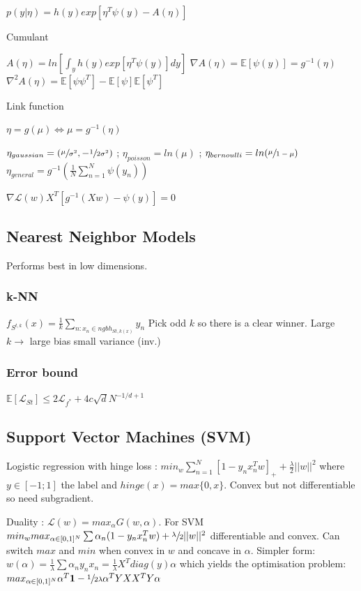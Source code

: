 $p(y|\eta) = h(y) exp[\eta^T \psi(y) - A(\eta)]$

Cumulant

$A(\eta) = ln[\int_y h(y) exp[\eta^T \psi(y)] dy]$
\newline
$\nabla A(\eta) = \mathbb{E}[\psi(y)] = g^{-1}(\eta)$
\newline
$\nabla^2 A(\eta) = \mathbb{E}[\psi\psi^T] - \mathbb{E}[\psi]\mathbb{E}[\psi^T]$

Link function

$\eta = g(\mu) \Leftrightarrow \mu = g^{-1}(\eta)$

$\eta_{gaussian} = (\sfrac{\mu}{\sigma^2}, -\sfrac{1}{2 \sigma^2})$
; $\eta_{poisson} = ln(\mu)$
; $\eta_{bernoulli} = ln(\sfrac{\mu}{1 - \mu})$
\newline $\eta_{general} = g^{-1}(\frac{1}{N} \sum_{n=1}^N \psi(y_n))$

$\nabla \mathcal{L}(w) X^T [g^{-1}(Xw)- \psi(y)]= 0$

\subsection{Nearest Neighbor Models}
Performs best in low dimensions.
\subsubsection{k-NN}
$f_{S^{t,k}}(x) = \frac{1}{k} \sum_{n:x_n\in ngbh_{S{t,k}(x)}} y_n$
Pick odd $k$ so there is a clear winner.
Large $k \rightarrow$ large bias small variance (inv.)

\subsubsection{Error bound}
$\mathbb{E}[\mathcal{L}_{St}] \le 2 \mathcal{L}_{f^*} + 4 c \sqrt{d} N^{-1/d+1}$

\subsection{Support Vector Machines (SVM)}
Logistic regression with hinge loss :
$min_w \sum_{n=1}^N [1-y_n x_n^T w]_+ + \frac{\lambda}{2} ||w||^2$ where $y \in [-1;1]$ the label and $hinge(x)= max\{0,x\}$. Convex but not differentiable so need subgradient.

Duality : $\mathcal{L}(w) = max_{\alpha} G(w, \alpha)$. For SVM
$min_{w} max_{\alpha \in [0,1]^N} \sum \alpha_n (1 - y_nx_n^Tw) + \sfrac{\lambda}{2} ||w||^2$ differentiable and convex. Can switch $max$ and $min$ when convex in $w$ and concave in $\alpha$. Simpler form:\newline
$w(\alpha) = \frac{1}{\lambda} \sum \alpha_n y_n x_n = \frac{1}{\lambda} X^T diag(y) \alpha$ which yields the optimisation problem:\newline
$max_{\alpha \in [0,1]^N} \alpha^T\mathbf{1} - \sfrac{1}{2\lambda} \alpha^T Y X X^T Y \alpha$\newline


